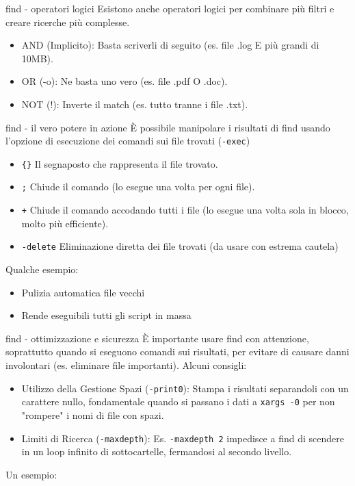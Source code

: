 \begin{frame}[fragile]{find - operatori logici}
	Esistono anche operatori logici per combinare più filtri e creare ricerche più complesse.
\begin{itemize}
	\item AND (Implicito): Basta scriverli di seguito (es. file .log E più grandi di 10MB).
	\item OR (-o): Ne basta uno vero (es. file .pdf O .doc).
	\item NOT (!): Inverte il match (es. tutto tranne i file .txt).
\end{itemize}
\end{frame}

\begin{frame}[fragile]{find - il vero potere in azione}
	È possibile manipolare i risultati di find usando l'opzione di esecuzione dei comandi sui file trovati (\texttt{-exec})
 \begin{itemize}
	\item \texttt{\{\}} Il segnaposto che rappresenta il file trovato.
	\item \texttt{;} Chiude il comando (lo esegue una volta per ogni file).
	\item \texttt{+} Chiude il comando accodando tutti i file (lo esegue una volta sola in blocco, molto più efficiente).
	\item \texttt{-delete} Eliminazione diretta dei file trovati (da usare con estrema cautela)
\end{itemize}
	Qualche esempio:
\begin{itemize}
	\item Pulizia automatica file vecchi 
	\item Rende eseguibili tutti gli script in massa 
\end{itemize}
\end{frame}

\begin{frame}[fragile]{find - ottimizzazione e sicurezza}
È importante usare find con attenzione, soprattutto quando si eseguono comandi sui risultati, per evitare di causare danni involontari (es. eliminare file importanti). Alcuni consigli:
\begin{itemize}
	\item Utilizzo della Gestione Spazi (\texttt{-print0}): Stampa i risultati separandoli con un carattere nullo, fondamentale quando si passano i dati a \texttt{xargs -0} per non "rompere" i nomi di file con spazi.
	\item Limiti di Ricerca ({\texttt{-maxdepth}}): 	Es. \texttt{-maxdepth 2} impedisce a find di scendere in un loop infinito di sottocartelle, fermandosi al secondo livello.
\end{itemize}
\medspace
Un esempio: 
\end{frame}

